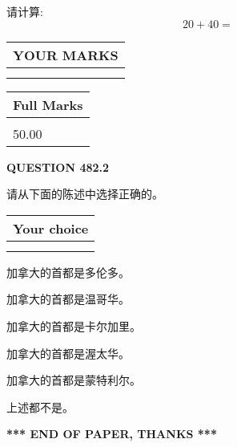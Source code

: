 \documentclass{ctexart}
\begin{document}
  
 
请计算:
\begin{equation}
20 +  %
40 = \nonumber
\end{equation}
 

 

 
  
\vspace{0.2in}
  
\noindent\begin{tabular}{|l|}
\hline
 YOUR MARKS  \\
\hline
 \\ 
 \\ 
\hline
\end{tabular}
\hspace{0.05in} \begin{tabular}{|l|}
\hline
 Full Marks  \\
\hline
 \\ 
50.00 \\
\hline
\end{tabular}
{\textbf{\Large{QUESTION
482.2 
}}}
  
  
请从下面的陈述中选择正确的。
  
  
\noindent\hspace{3.0in} \begin{tabular}{|l|}
\hline
Your choice \\
\hline
 \\ 
 \\ 
\hline
\end{tabular}
  
  
 
 
加拿大的首都是多伦多。
 
 
加拿大的首都是温哥华。
 
 
加拿大的首都是卡尔加里。
 
 
加拿大的首都是渥太华。
 
 
加拿大的首都是蒙特利尔。
 
 
 上述都不是。
 
 
   
   
 \vspace{0.2in}
 
   
   
   
   
\vspace{1.0in} 
{\textbf{\large{ *** END OF PAPER, THANKS *** }}} 
   
\end{document}

